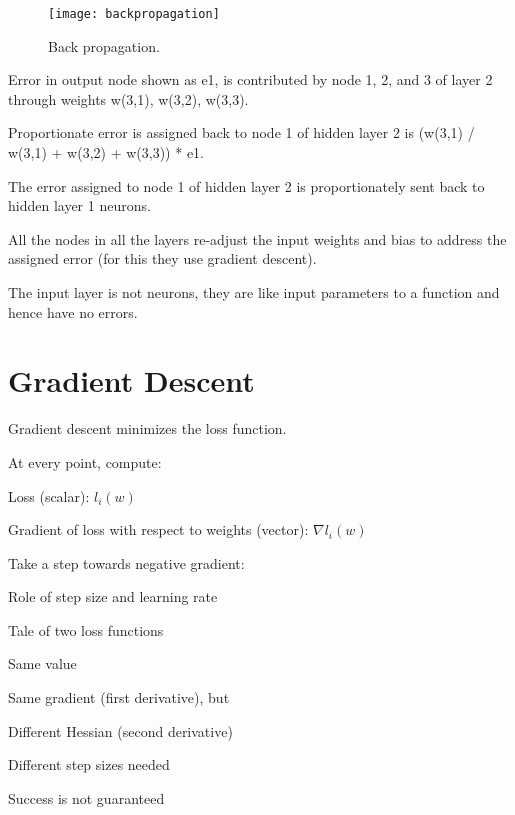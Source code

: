  	\begin{figure}[h]
		\centering
		\texttt{[image: backpropagation]}
		\caption{Back propagation.}
		\label{fig:backpropagation}
	\end{figure}

	\begin{bulletedlist}
		\item Error in output node shown as e1, is contributed by node 1, 2, and 3 of layer 2 through weights w(3,1), w(3,2), w(3,3).
		\item Proportionate error is assigned back to node 1 of hidden layer 2 is (w(3,1) / w(3,1) + w(3,2) + w(3,3)) * e1.
		\item The error assigned to node 1 of hidden layer 2 is proportionately sent back to hidden layer 1 neurons.
		\item All the nodes in all the layers re-adjust the input weights and bias to address the assigned error (for this they use gradient descent).
		\item The input layer is not neurons, they are like input parameters to a function and hence have no errors.
	\end{bulletedlist}


	\section{Gradient Descent}

	\begin{bulletedlist}
		\item Gradient descent minimizes the loss function.
		\item At every point, compute:
		\begin{bulletedlist}
			\item Loss (scalar): $l_i(w)$
			\item Gradient of loss with respect to weights (vector): $\nabla l_i(w)$
			\item Take a step towards negative gradient:
		\end{bulletedlist}
	\end{bulletedlist}

Role of step size and learning rate
	\begin{bulletedlist}
		\item Tale of two loss functions
		\begin{bulletedlist}
			\item Same value
			\item Same gradient (first derivative), but
			\item Different Hessian (second derivative)
			\item Different step sizes needed
		\end{bulletedlist}
		\item Success is not guaranteed
	\end{bulletedlist}

